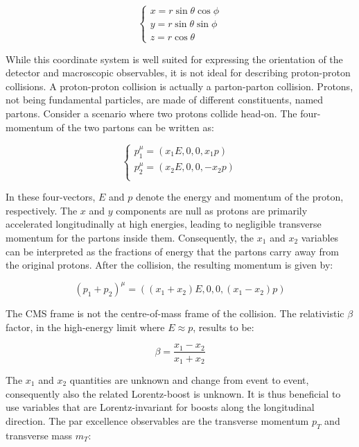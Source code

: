 \documentclass[11pt]{article}
\begin{document}
\begin{equation}
\label{eq:xyzcoords}
\begin{cases}
x = r \sin \theta \cos \phi \\
y = r \sin \theta \sin \phi \\
z = r \cos \theta
\end{cases}
\end{equation}

While this coordinate system is well suited for expressing the orientation of the detector and macroscopic observables, it is not ideal for describing proton-proton collisions.
A proton-proton collision is actually a parton-parton collision.
Protons, not being fundamental particles, are made of different constituents, named partons.
Consider a scenario where two protons collide head-on.
The four-momentum of the two partons can be written as:

\begin{equation}
\label{eq:momenta}
\begin{cases}
p^{\mu}_1 = (x_1E, 0, 0, x_1p) \\
p^{\mu}_2 = (x_2E, 0, 0, -x_2p) \\
\end{cases}
\end{equation}

In these four-vectors, \(E\) and \(p\) denote the energy and momentum of the proton, respectively.
The \(x\) and \(y\) components are null as protons are primarily accelerated longitudinally at high energies, leading to negligible transverse momentum for the partons inside them.
Consequently, the \(x_1\) and \(x_2\) variables can be interpreted as the fractions of energy that the partons carry away from the original protons.
After the collision, the resulting momentum is given by:

\begin{equation}
\label{eq:pmomenta}
(p_1 + p_2)^{\mu} = ((x_1 + x_2)E, 0, 0, (x_1 - x_2)p)
\end{equation}

The CMS frame is not the centre-of-mass frame of the collision.
The relativistic \(\beta\) factor, in the high-energy limit where \(E \approx p\), results to be:

\begin{equation}
\label{eq:beta}
\beta = \frac{x_1 - x_2}{x_1 + x_2}
\end{equation}

The \(x_1\) and \(x_2\) quantities are unknown and change from event to event, consequently also the related Lorentz-boost is unknown.
It is thus beneficial to use variables that are Lorentz-invariant for boosts along the longitudinal direction.
The par excellence observables are the transverse momentum \(p_T\) and transverse mass \(m_T\):
\end{document}
